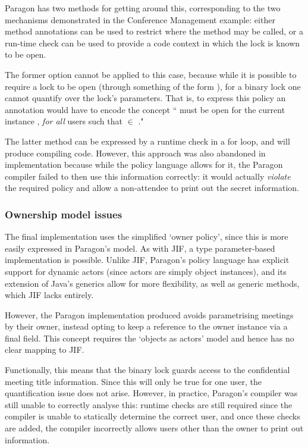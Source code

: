 Paragon has two methods for getting around this, corresponding to the two mechanisms demonstrated in the Conference Management example: either method annotations can be used to restrict where the method may be called, or a run-time check can be used to provide a code context in which the lock is known to be open.

The former option cannot be applied to this case, because while it is possible to require a lock to be open (through something of the form ), for a binary lock one cannot quantify over the lock's parameters. That is, to express this policy an annotation would have to encode the concept `` must be open for the current instance , \textit{for all} users  such that  $ \in $ ."

The latter method can be expressed by a runtime check in a for loop, and will produce compiling code. However, this approach was also abandoned in implementation because while the policy language allows for it, the Paragon compiler failed to then use this information correctly: it would actually \textit{violate} the required policy and allow a non-attendee to print out the secret information.


\subsubsection{Ownership model issues}

The final implementation uses the simplified `owner policy', since this is more easily expressed in Paragon's model. As with JIF, a type parameter-based implementation is possible. Unlike JIF, Paragon's policy language has explicit support for dynamic actors (since actors are simply object instances), and its extension of Java's generics allow for more flexibility, as well as generic methods, which JIF lacks entirely.

However, the Paragon implementation produced avoids parametrising meetings by their owner, instead opting to keep a reference to the owner instance via a final field. This concept requires the `objects as actors' model and hence has no clear mapping to JIF.

Functionally, this means that the binary lock  guards access to the confidential meeting title information. Since this will only be true for one user, the quantification issue does not arise. However, in practice, Paragon's compiler was still unable to correctly analyse this: runtime checks are still required since the compiler is unable to statically determine the correct user, and once these checks are added, the compiler incorrectly allows users other than the owner to print out information.

